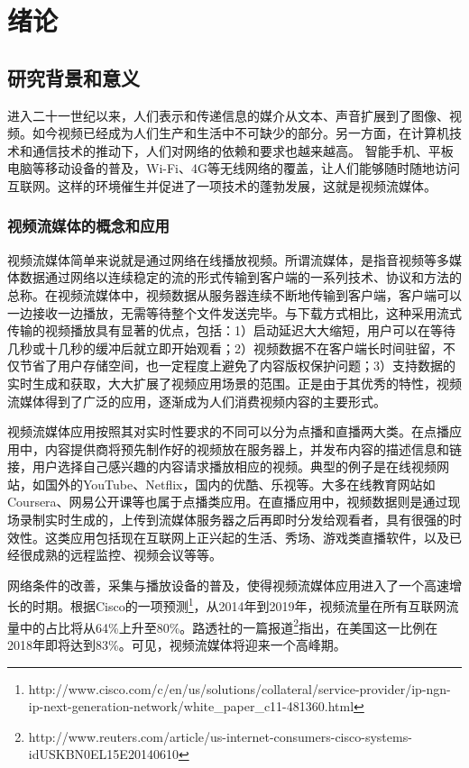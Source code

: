 \chapter{绪论}

\section{研究背景和意义}

进入二十一世纪以来，人们表示和传递信息的媒介从文本、声音扩展到了图像、视频。如今视频已经成为人们生产和生活中不可缺少的部分。另一方面，在计算机技术和通信技术的推动下，人们对网络的依赖和要求也越来越高。
智能手机、平板电脑等移动设备的普及，Wi-Fi、4G等无线网络的覆盖，让人们能够随时随地访问互联网。这样的环境催生并促进了一项技术的蓬勃发展，这就是视频流媒体。

\subsection{视频流媒体的概念和应用}

视频流媒体简单来说就是通过网络在线播放视频。所谓流媒体，是指音视频等多媒体数据通过网络以连续稳定的流的形式传输到客户端的一系列技术、协议和方法的总称。在视频流媒体中，视频数据从服务器连续不断地传输到客户端，客户端可以一边接收一边播放，无需等待整个文件发送完毕。与下载方式相比，这种采用流式传输的视频播放具有显著的优点\supercite{Li2002}，包括：1）启动延迟大大缩短，用户可以在等待几秒或十几秒的缓冲后就立即开始观看；2）视频数据不在客户端长时间驻留，不仅节省了用户存储空间，也一定程度上避免了内容版权保护问题；3）支持数据的实时生成和获取，大大扩展了视频应用场景的范围。正是由于其优秀的特性，视频流媒体得到了广泛的应用，逐渐成为人们消费视频内容的主要形式\supercite{Chen2013}。

视频流媒体应用按照其对实时性要求的不同可以分为点播和直播两大类。在点播应用中，内容提供商将预先制作好的视频放在服务器上，并发布内容的描述信息和链接，用户选择自己感兴趣的内容请求播放相应的视频。典型的例子是在线视频网站，如国外的YouTube、Netflix，国内的优酷、乐视等。大多在线教育网站如Coursera、网易公开课等也属于点播类应用。在直播应用中，视频数据则是通过现场录制实时生成的，上传到流媒体服务器之后再即时分发给观看者，具有很强的时效性。这类应用包括现在互联网上正兴起的生活、秀场、游戏类直播软件，以及已经很成熟的远程监控、视频会议等等。

网络条件的改善，采集与播放设备的普及，使得视频流媒体应用进入了一个高速增长的时期。根据Cisco的一项预测\footnote{http://www.cisco.com/c/en/us/solutions/collateral/service-provider/ip-ngn-ip-next-generation-network/white\_paper\_c11-481360.html}，从2014年到2019年，视频流量在所有互联网流量中的占比将从64\%上升至80\%。路透社的一篇报道\footnote{http://www.reuters.com/article/us-internet-consumers-cisco-systems-idUSKBN0EL15E20140610}指出，在美国这一比例在2018年即将达到83\%。可见，视频流媒体将迎来一个高峰期。

